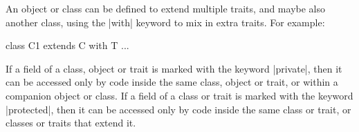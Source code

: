 An object or class can be defined to extend multiple traits, and maybe also
another class, using the |with| keyword to mix in extra
traits.  For example:%
\begin{scala}
  class C1 extends C with T{ ... }
\end{scala}

If a field of a class, object or trait is marked with the keyword
|private|, then it can be accessed only by code
inside the same class, object or trait, or within a companion object or class.
%
If a field of a class or trait is marked with the keyword
|protected|, then it can be accessed only by code inside
the same class or trait, or classes or traits that extend it.



